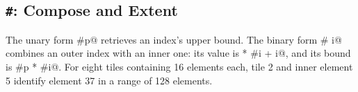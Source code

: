 \subsection*{\texttt{\#}: Compose and Extent}

The unary form \co@#p@ retrieves an index's upper bound. The binary form \co@p # i@ combines an outer index with an inner one: its value is \co@p * #i + i@, and its bound is \co@#p * #i@. For eight tiles containing 16 elements each, tile 2 and inner element 5 identify element 37 in a range of 128 elements.
